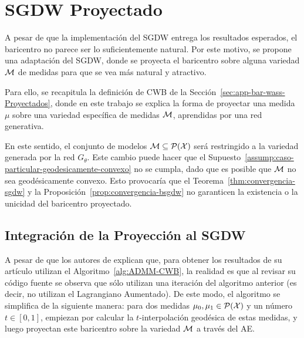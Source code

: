 \section{SGDW Proyectado}\label{sec:sgdwp}  %


A pesar de que la implementación del SGDW entrega los resultados esperados, el baricentro no parece ser lo suficientemente natural. Por este motivo, se propone una adaptación del SGDW, donde se proyecta el baricentro sobre alguna variedad $\Manifold$ de medidas para que se vea más natural y atractivo.

Para ello, se recapitula la definición de CWB de la Sección~\ref{sec:app-bar-wass-Proyectados}, donde en este trabajo \cite{simon2020barycenters} se explica la forma de proyectar una medida $\mu$ sobre una variedad específica de medidas $\Manifold$, aprendidas por una red generativa.

En este sentido, el conjunto de modelos $\Manifold\subseteq \ProbSpace[\cX] $ será restringido a la variedad generada por la red $G_\theta$. Este cambio puede hacer que el Supuesto~\ref{assump:caso-particular-geodesicamente-convexo} no se cumpla, dado que es posible que $\Manifold$ no sea geodésicamente convexo. Esto provocaría que el Teorema~\ref{thm:convergencia-sgdw} y la Proposición~\ref{prop:convergencia-bsgdw} no garanticen la existencia o la unicidad del baricentro proyectado.




\subsection{Integración de la Proyección al SGDW}\label{ssec:sgdwp-deduccion-algoritmo}  %

A pesar de que los autores de \cite{simon2020barycenters} explican que, para obtener los resultados de su artículo utilizan el Algoritmo~\ref{alg:ADMM-CWB}, la realidad es que al revisar su código fuente \cite{imagebar2020simon} se observa que sólo utilizan una iteración del algoritmo anterior (es decir, no utilizan el Lagrangiano Aumentado). De este modo, el algoritmo se simplifica de la siguiente manera: para dos medidas $\mu_0, \mu_1 \in \ProbSpace[\cX] $ y un número $t \in [0, 1]$, empiezan por calcular la $t$-interpolación geodésica de estas medidas, y luego proyectan este baricentro sobre la variedad $\Manifold$ a través del AE.

